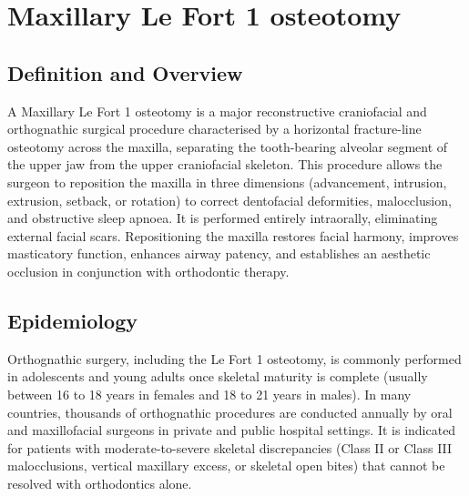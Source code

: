 \chapter{Maxillary Le Fort 1 osteotomy}

\section*{Definition and Overview}
A Maxillary Le Fort 1 osteotomy is a major reconstructive craniofacial and orthognathic surgical procedure characterised by a horizontal fracture-line osteotomy across the maxilla, separating the tooth-bearing alveolar segment of the upper jaw from the upper craniofacial skeleton. This procedure allows the surgeon to reposition the maxilla in three dimensions (advancement, intrusion, extrusion, setback, or rotation) to correct dentofacial deformities, malocclusion, and obstructive sleep apnoea. It is performed entirely intraorally, eliminating external facial scars. Repositioning the maxilla restores facial harmony, improves masticatory function, enhances airway patency, and establishes an aesthetic occlusion in conjunction with orthodontic therapy.

\section*{Epidemiology}
Orthognathic surgery, including the Le Fort 1 osteotomy, is commonly performed in adolescents and young adults once skeletal maturity is complete (usually between 16 to 18 years in females and 18 to 21 years in males). In many countries, thousands of orthognathic procedures are conducted annually by oral and maxillofacial surgeons in private and public hospital settings. It is indicated for patients with moderate-to-severe skeletal discrepancies (Class II or Class III malocclusions, vertical maxillary excess, or skeletal open bites) that cannot be resolved with orthodontics alone.

